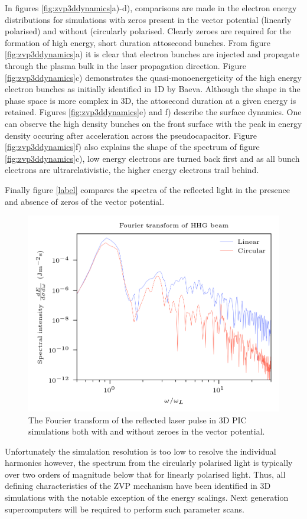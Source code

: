 In figures \ref{fig:zvp3ddynamics}a)-d), comparisons are made in the electron energy distributions for simulations with zeros present in the vector potential (linearly polarised) and without (circularly polarised. Clearly zeroes are required for the formation of high energy, short duration attosecond bunches. From figure \ref{fig:zvp3ddynamics}a) it is clear that electron bunches are injected and propagate through the plasma bulk in the laser propagation direction. Figure \ref{fig:zvp3ddynamics}c) demonstrates the quasi-monoenergeticity of the high energy electron bunches as initially identified in 1D by Baeva. Although the shape in the phase space is more complex in 3D, the attosecond duration at a given energy is retained. Figures \ref{fig:zvp3ddynamics}e) and f) describe the surface dynamics. One can observe the high density bunches on the front surface with the peak in energy density occuring after acceleration across the pseudocapacitor. Figure \ref{fig:zvp3ddynamics}f) also explains the shape of the spectrum of figure \ref{fig:zvp3ddynamics}c), low energy electrons are turned back first and as all bunch electrons are ultrarelativistic, the higher energy electrons trail behind.

Finally figure \ref{label} compares the spectra of the reflected light in the presence and absence of zeros of the vector potential.
\begin{figure}
	\centering
	\includegraphics[width=0.7\linewidth]{figures/zvp/zvp_hhg_beam_fourier}
	\caption[The Fourier transform of the reflected laser pulse in 3D PIC simulations.]{The Fourier transform of the reflected laser pulse in 3D PIC simulations both with and without zeroes in the vector potential.}
	\label{fig:zvphhgbeamfourier}
\end{figure}
Unfortunately the simulation resolution is too low to resolve the individual harmonics however, the spectrum from the circularly polarised light is typically over two orders of magnitude below that for linearly polarised light. Thus, all defining characteristics of the ZVP mechanism have been identified in 3D simulations with the notable exception of the energy scalings. Next generation supercomputers will be required to perform such parameter scans.


